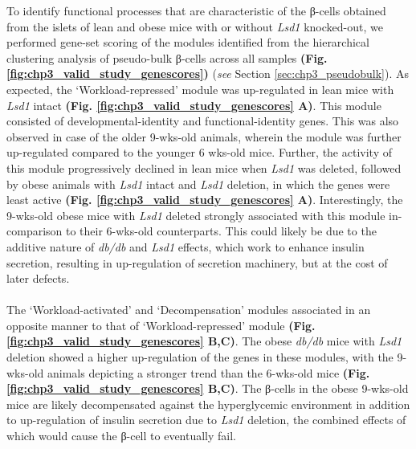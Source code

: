 To identify functional processes that are characteristic of the β-cells obtained from the islets of lean and obese mice with or without \textit{Lsd1} knocked-out, we performed gene-set scoring of the modules identified from the hierarchical clustering analysis of pseudo-bulk β-cells across all samples \textbf{(Fig. \ref{fig:chp3_valid_study_genescores})} (\textit{see} Section \ref{sec:chp3_pseudobulk}). As expected, the `Workload-repressed' module was up-regulated in lean mice with \textit{Lsd1} intact \textbf{(Fig. \ref{fig:chp3_valid_study_genescores} A)}. This module consisted of developmental-identity and functional-identity genes. This was also observed in case of the older 9-wks-old animals, wherein the module was further up-regulated compared to the younger 6 wks-old mice. Further, the activity of this module progressively declined in lean mice when \textit{Lsd1} was deleted, followed by obese animals with \textit{Lsd1} intact and \textit{Lsd1} deletion, in which the genes were least active \textbf{(Fig. \ref{fig:chp3_valid_study_genescores} A)}. Interestingly, the 9-wks-old obese mice with \textit{Lsd1} deleted strongly associated with this module in-comparison to their 6-wks-old counterparts. This could likely be due to the additive nature of \textit{db/db} and \textit{Lsd1} effects, which work to enhance insulin secretion, resulting in up-regulation of secretion machinery, but at the cost of later defects.\\\\
The `Workload-activated' and `Decompensation' modules associated in an opposite manner to that of `Workload-repressed' module \textbf{(Fig. \ref{fig:chp3_valid_study_genescores} B,C)}. The obese \textit{db/db} mice with \textit{Lsd1} deletion showed a higher up-regulation of the genes in these modules, with the 9-wks-old animals depicting a stronger trend than the 6-wks-old mice \textbf{(Fig. \ref{fig:chp3_valid_study_genescores} B,C)}. The β-cells in the obese 9-wks-old mice are likely decompensated against the hyperglycemic environment in addition to up-regulation of insulin secretion due to \textit{Lsd1} deletion, the combined effects of which would cause the β-cell to eventually fail.


